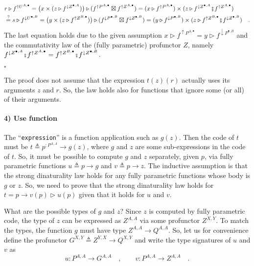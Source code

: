 \begin{align*}
 & r\triangleright f^{\uparrow U^{A,\bullet}}=\big(x\times(z\triangleright f^{\downarrow Z^{\bullet,A}})\big)\triangleright(f^{\uparrow P^{A,\bullet}}\boxtimes f^{\uparrow Z^{A,\bullet}})=(x\triangleright f^{\uparrow P^{A,\bullet}})\times(z\triangleright f^{\downarrow Z^{\bullet,A}}\bef f^{\uparrow Z^{A,\bullet}})\\
 & \overset{?}{=}s\triangleright f^{\downarrow U^{\bullet,B}}=\big(y\times(z\triangleright f^{\uparrow Z^{B,\bullet}})\big)\triangleright(f^{\downarrow P^{\bullet,B}}\boxtimes f^{\downarrow Z^{\bullet,B}})=(y\triangleright f^{\downarrow P^{\bullet,B}})\times(z\triangleright f^{\uparrow Z^{B,\bullet}}\bef f^{\downarrow Z^{\bullet,B}})\quad.
\end{align*}
The last equation holds due to the given assumption $x\triangleright f^{\uparrow P^{A,\bullet}}=y\triangleright f^{\downarrow P^{\bullet,B}}$
and the commutativity law of the (fully parametric) profunctor $Z$,
namely $f^{\downarrow Z^{\bullet,A}}\bef f^{\uparrow Z^{A,\bullet}}=f^{\uparrow Z^{B,\bullet}}\bef f^{\downarrow Z^{\bullet,B}}$.

$\square$

The proof does not assume that the expression $t(z)(r)$ actually
uses its arguments $z$ and $r$. So, the law holds also for functions
that ignore some (or all) of their arguments.

\paragraph{4) Use function }

The \textsf{``}\lstinline!expression!\textsf{''} is a function application such as
$g(z)$. Then the code of $t$ must be $t\triangleq p^{:P^{A,A}}\rightarrow g(z)$,
where $g$ and $z$ are some sub-expressions in the code of $t$.
So, it must be possible to compute $g$ and $z$ separately, given
$p$, via fully parametric functions $u\triangleq p\rightarrow g$
and $v\triangleq p\rightarrow z$. The inductive assumption is that
the strong dinaturality law holds for any fully parametric functions
whose body is $g$ or $z$. So, we need to prove that the strong dinaturality
law holds for $t=p\rightarrow v(p)\triangleright u(p)$ given that
it holds for $u$ and $v$.

What are the possible types of $g$ and $z$? Since $z$ is computed
by fully parametric code, the type of $z$ can be expressed as $Z^{A,A}$
via some profunctor $Z^{X,Y}$. To match the types, the function $g$
must have type $Z^{A,A}\rightarrow Q^{A,A}$. So, let us for convenience
define the profunctor $G^{X,Y}\triangleq Z^{Y,X}\rightarrow Q^{X,Y}$
and write the type signatures of $u$ and $v$ as
\[
u:P^{A,A}\rightarrow G^{A,A}\quad,\quad\quad v:P^{A,A}\rightarrow Z^{A,A}\quad.
\]

